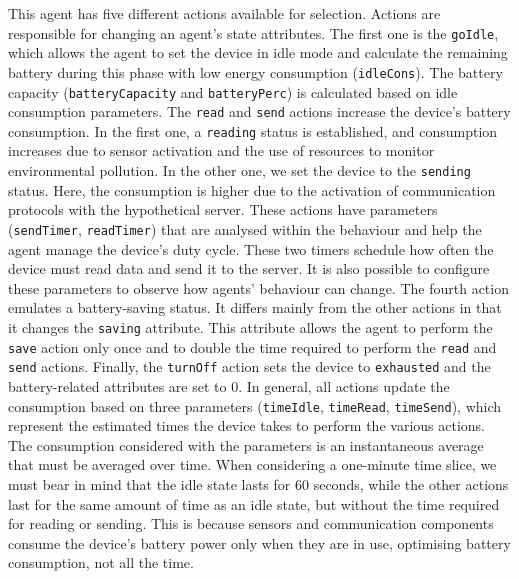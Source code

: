 \documentclass[runningheads]{llncs}
\begin{document}
This agent has five different actions available for selection. Actions are responsible for changing an agent's state attributes. The first one is the \lstinline{goIdle}, which allows the agent to set the device in idle mode and calculate the remaining battery during this phase with low energy consumption (\lstinline{idleCons}). 
%
The battery capacity (\lstinline{batteryCapacity} and \lstinline{batteryPerc}) is calculated based on idle consumption parameters.
%
The \lstinline{read} and \lstinline{send} actions increase the device's battery consumption.
%
In the first one, a \lstinline{reading} status is established, and consumption increases due to sensor activation and the use of resources to monitor environmental pollution. 
%
In the other one, we set the device to the \lstinline{sending} status. Here, the consumption is higher due to the activation of communication protocols with the hypothetical server.
%
These actions have parameters (\lstinline{sendTimer}, \lstinline{readTimer}) that are analysed within the behaviour and help the agent manage the device's duty cycle. 
%
These two timers schedule how often the device must read data and send it to the server. It is also possible to configure these parameters to observe how agents' behaviour can change. 
%
The fourth action emulates a battery-saving status. It differs mainly from the other actions in that it changes the \lstinline{saving} attribute.
This attribute allows the agent to perform the \lstinline{save} action only once and to double the time required to perform the \lstinline{read} and \lstinline{send} actions.
%
Finally, the \lstinline{turnOff} action sets the device to \lstinline{exhausted} and the battery-related attributes are set to 0.
%
In general, all actions update the consumption based on three parameters (\lstinline{timeIdle}, \lstinline{timeRead}, \lstinline{timeSend}), which represent the estimated times the device takes to perform the various actions. The consumption considered with the parameters is an instantaneous average that must be averaged over time. 
%
When considering a one-minute time slice, we must bear in mind that the idle state lasts for 60 seconds, while the other actions last for the same amount of time as an idle state, but without the time required for reading or sending. This is because sensors and communication components consume the device's battery power only when they are in use, optimising battery consumption, not all the time.
\end{document}
